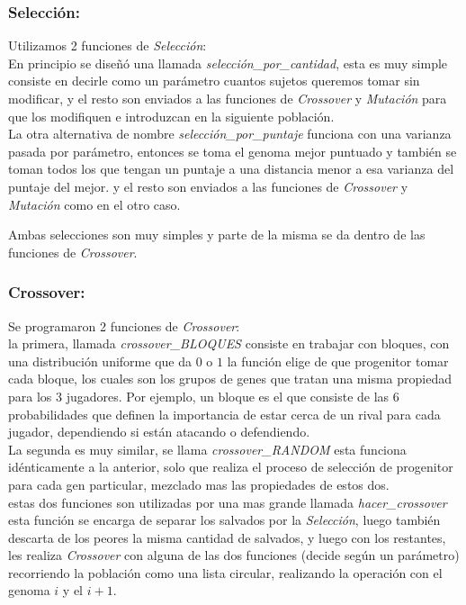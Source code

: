 \subsubsection{Selección:}

Utilizamos 2 funciones de \emph{Selección}:\\

En principio se diseñó una llamada \emph{selección\_por\_cantidad}, esta es muy simple consiste en decirle como un parámetro cuantos
sujetos queremos tomar sin modificar, y el resto son enviados a las funciones de \emph{Crossover} y \emph{Mutación} para que
los modifiquen e introduzcan en la siguiente población.\\

La otra alternativa de nombre \emph{selección\_por\_puntaje} funciona con una varianza pasada por parámetro, entonces se toma el genoma
mejor puntuado y también se toman todos los que tengan un puntaje a una distancia menor a esa varianza del puntaje del mejor. y el resto
son enviados a las funciones de \emph{Crossover} y \emph{Mutación} como en el otro caso.


Ambas selecciones son muy simples y parte de la misma se da dentro de las funciones de \emph{Crossover}.

\subsubsection{Crossover:}
Se programaron 2 funciones de \emph{Crossover}:\\

la primera, llamada \emph{crossover\_BLOQUES} consiste en trabajar con bloques, con una distribución uniforme que da $0$ o $1$
la función elige de que progenitor tomar cada bloque, los cuales son los grupos de genes que tratan una misma propiedad para los
3 jugadores. Por ejemplo, un bloque es el que consiste de las 6 probabilidades que definen la importancia de estar cerca de un rival
para cada jugador, dependiendo si están atacando o defendiendo.\\

La segunda es muy similar, se llama \emph{crossover\_RANDOM} esta funciona idénticamente a la anterior, solo que realiza el proceso
de selección de progenitor para cada gen particular, mezclado mas las propiedades de estos dos.\\

estas dos funciones son utilizadas por una mas grande llamada \emph{hacer\_crossover} esta función se encarga de separar los salvados
por la \emph{Selección}, luego también descarta de los peores la misma cantidad de salvados, y luego con los restantes, les realiza
\emph{Crossover} con alguna de las dos funciones (decide según un parámetro) recorriendo la población como una lista circular,
realizando la operación con el genoma $i$ y el $i+1$.

